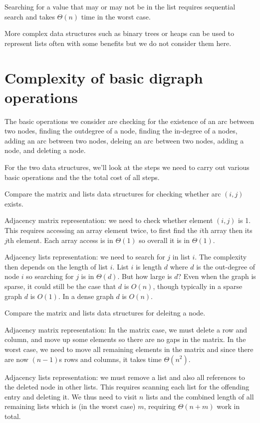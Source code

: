 Searching for  a value that may or may not be in the list requires sequential search
and takes $\Theta(n)$ time in the worst case. 

More complex data structures such as binary trees or heaps can be used to represent lists often with some benefits  but we do not consider them here. 

\section{Complexity of basic digraph operations}

The basic operations we consider are checking for the existence of an arc between two nodes, finding the outdegree of a node, finding the in-degree of  a nodes, adding an arc between two nodes, deleing an arc between two nodes, adding a node, and deleting a node. 

For the two data structures, we'll look at the steps we need to carry out various basic operations and the the total cost of all steps. 
 
\beginboxedexample
 Compare the matrix and lists data structures for checking whether arc $(i,j)$ exists.
 
Adjacency matrix representation: we need to check whether element $(i,j)$ is 1. This requires accessing
an array element twice, to first find the $i$th array then its $j$th element. Each array access is in $\Theta(1)$ so overall it is in $\Theta(1)$.

Adjacency lists representation: we need to search for $j$ in list $i$. The complexity then depends on the length of list $i$. List $i$ is length $d$ where $d$ is the out-degree of node $i$ so searching for $j$ is in $\Theta(d)$. But how large is $d$? Even when the graph is sparse, it could still be the case that $d$ is $O(n)$, though typically in a sparse graph $d$ is $O(1)$.  In a dense graph $d$ is $O(n)$.
\endboxedexample{0cm}

\beginboxedexample
 Compare the matrix and lists data structures for deleitng a node.

Adjacency matrix representation: In the matrix case, we must delete
a row and column, and move up some elements so there are no gaps
in the matrix. In the worst case, we need to move all remaining elements in the matrix and since there are now $(n-1)$s rows and columns, it takes time $\Theta(n^2)$.

Adjacency lists representation: we must remove a list and also
all references to the deleted node in other lists. This requires
scanning each list for the offending entry and deleting it. We thus need to visit $n$ lists and the combined length of all remaining lists which is (in the worst case) $m$, requiring $\Theta(n+m)$ work in total.
\endboxedexample{0cm}
 
